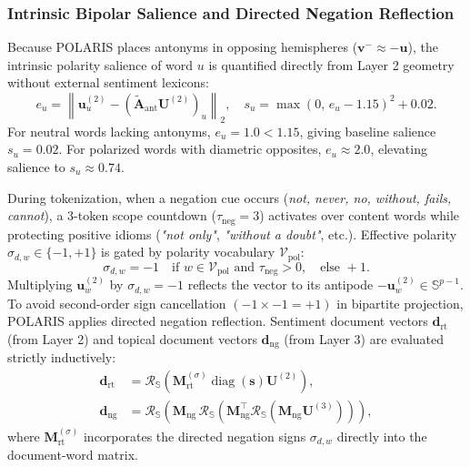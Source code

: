 \documentclass[journal]{IEEEtran}
\begin{document}
\subsubsection{Intrinsic Bipolar Salience and Directed Negation Reflection}
Because POLARIS places antonyms in opposing hemispheres ($\mathbf{v}^- \approx -\mathbf{u}$), the intrinsic polarity salience of word $u$ is quantified directly from Layer 2 geometry without external sentiment lexicons:
\begin{equation}
e_u = \left\|\mathbf{u}_u^{(2)} - \left(\tilde{\mathbf{A}}_{\text{ant}}\mathbf{U}^{(2)}\right)_u\right\|_2, \quad s_u = \max\!\left(0, \, e_u - 1.15\right)^2 + 0.02.
\label{eq:bipolar_energy}
\end{equation}
For neutral words lacking antonyms, $e_u = 1.0 < 1.15$, giving baseline salience $s_u = 0.02$. For polarized words with diametric opposites, $e_u \approx 2.0$, elevating salience to $s_u \approx 0.74$.

During tokenization, when a negation cue occurs (\textit{not, never, no, without, fails, cannot}), a 3-token scope countdown ($\tau_{\text{neg}} = 3$) activates over content words while protecting positive idioms (\textit{"not only"}, \textit{"without a doubt"}, etc.). Effective polarity $\sigma_{d,w} \in \{-1, +1\}$ is gated by polarity vocabulary $\mathcal{V}_{\text{pol}}$:
\begin{equation}
\sigma_{d,w} = -1 \quad \text{if } w \in \mathcal{V}_{\text{pol}} \text{ and } \tau_{\text{neg}} > 0, \quad \text{else } +1.
\label{eq:negation_gate}
\end{equation}
Multiplying $\mathbf{u}_w^{(2)}$ by $\sigma_{d,w} = -1$ reflects the vector to its antipode $-\mathbf{u}_w^{(2)} \in \mathbb{S}^{p-1}$. To avoid second-order sign cancellation $(-1 \times -1 = +1)$ in bipartite projection, POLARIS applies directed negation reflection. Sentiment document vectors $\mathbf{d}_{\text{rt}}$ (from Layer 2) and topical document vectors $\mathbf{d}_{\text{ng}}$ (from Layer 3) are evaluated strictly inductively:
\begin{align}
\mathbf{d}_{\text{rt}} &= \mathcal{R}_{\mathbb{S}}\!\left(\mathbf{M}_{\text{rt}}^{(\sigma)} \operatorname{diag}(\mathbf{s})\mathbf{U}^{(2)}\right), \label{eq:doc_rt} \\
\mathbf{d}_{\text{ng}} &= \mathcal{R}_{\mathbb{S}}\!\left(\mathbf{M}_{\text{ng}} \, \mathcal{R}_{\mathbb{S}}\!\left(\mathbf{M}_{\text{ng}}^\top \mathcal{R}_{\mathbb{S}}\!\left(\mathbf{M}_{\text{ng}}\mathbf{U}^{(3)}\right)\right)\right), \label{eq:doc_ng}
\end{align}
where $\mathbf{M}_{\text{rt}}^{(\sigma)}$ incorporates the directed negation signs $\sigma_{d,w}$ directly into the document-word matrix.
\end{document}
